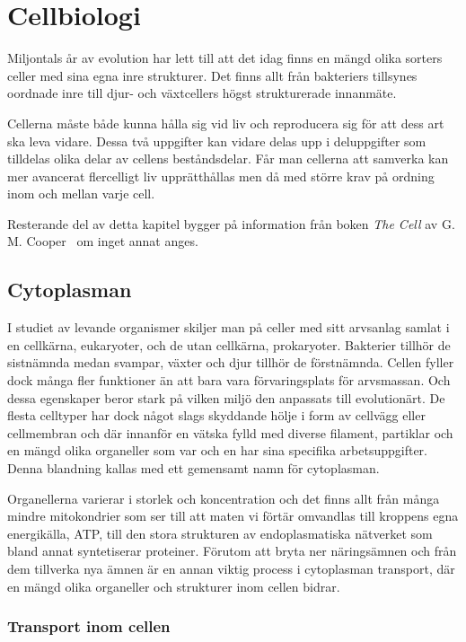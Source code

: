 \chapter{Cellbiologi}

Miljontals år av evolution har lett till att det idag finns en mängd olika sorters celler med sina egna inre strukturer. Det finns allt från bakteriers tillsynes oordnade inre till djur- och växtcellers högst strukturerade innanmäte. 

Cellerna måste både kunna hålla sig vid liv och reproducera sig för att dess art ska leva vidare. Dessa två uppgifter kan vidare delas upp i deluppgifter som tilldelas olika delar av cellens beståndsdelar. Får man cellerna att samverka kan mer avancerat flercelligt liv upprätthållas men då med större krav på ordning inom och mellan varje cell.

Resterande del av detta kapitel bygger på information från boken \emph{The Cell} av G. M.  Cooper~\cite{Cooper_TheCell2000} om inget annat anges.


\section{Cytoplasman}
I studiet av levande organismer skiljer man på celler med sitt arvsanlag samlat i en cellkärna, eukaryoter, och de utan cellkärna, prokaryoter. Bakterier tillhör de sistnämnda medan svampar, växter och djur tillhör de förstnämnda. Cellen fyller dock många fler funktioner än att bara vara förvaringsplats för arvsmassan. Och dessa egenskaper beror stark på vilken miljö den anpassats till evolutionärt. De flesta celltyper har dock något slags skyddande hölje i form av cellvägg eller cellmembran och där innanför en vätska fylld med diverse filament, partiklar och en mängd olika organeller som var och en har sina specifika arbetsuppgifter. Denna blandning kallas med ett gemensamt namn för cytoplasman. 

Organellerna varierar i storlek och koncentration och det finns allt från många mindre mitokondrier som ser till att maten vi förtär omvandlas till kroppens egna energikälla, ATP, till den stora strukturen av endoplasmatiska nätverket som bland annat syntetiserar proteiner. Förutom att bryta ner näringsämnen och från dem tillverka nya ämnen är en annan viktig process i cytoplasman transport, där en mängd olika organeller och strukturer inom cellen bidrar.


\subsection{Transport inom cellen}

